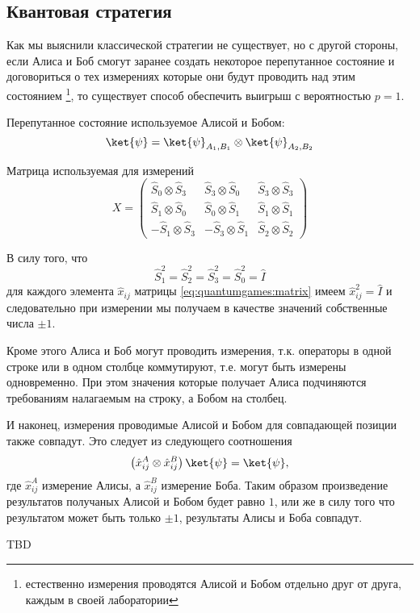 \subsection{Квантовая стратегия}
Как мы выяснили классической стратегии не существует, но с другой
стороны, если Алиса и Боб смогут заранее создать некоторое
перепутанное состояние и договориться о тех измерениях которые они
будут проводить над этим состоянием
\footnote{
естественно измерения проводятся Алисой и Бобом отдельно друг от
друга, каждым в своей лаборатории 
}, то существует способ обеспечить выигрыш с вероятностью $p = 1$.

Перепутанное состояние используемое Алисой и Бобом:
\begin{equation}
\ket{\psi} = \ket{\psi}_{A_1,B_1} \otimes \ket{\psi}_{A_2,B_2}
\nonumber
\end{equation}

Матрица используемая для измерений
\begin{equation}
X =
\left(
\begin{array}{ccc}
\hat{S}_0 \otimes \hat{S}_3 & \hat{S}_3 \otimes \hat{S}_0 & \hat{S}_3 \otimes \hat{S}_3 \\
\hat{S}_1 \otimes \hat{S}_0 & \hat{S}_0 \otimes \hat{S}_1 & \hat{S}_1 \otimes \hat{S}_1 \\
- \hat{S}_1 \otimes \hat{S}_3 & - \hat{S}_3 \otimes \hat{S}_1 & \hat{S}_2 \otimes \hat{S}_2  
\end{array}
\right)
\label{eq:quantumgames:matrix}
\end{equation}

В силу того, что 
\[
\hat{S}_1^2 = \hat{S}_2^2 = \hat{S}_3^2 = \hat{S}_0^2 = \hat{I}
\]
для каждого элемента $\hat{x}_{ij}$ матрицы
\eqref{eq:quantumgames:matrix} имеем $\hat{x}_{ij}^2 = \hat{I}$ и
следовательно при измерении мы получаем в качестве значений
собственные числа $\pm 1$.

Кроме этого Алиса и Боб могут проводить измерения, т.к. операторы в
одной строке или в одном столбце коммутируют, т.е. могут быть измерены
одновременно. При этом значения которые получает Алиса подчиняются
требованиям налагаемым на строку, а Бобом на столбец.

И наконец, измерения проводимые Алисой и Бобом для совпадающей позиции
также совпадут. Это следует из следующего соотношения
\[
\left(\hat{x}_{ij}^A \otimes \hat{x}_{ij}^B\right) \ket{\psi} = \ket{\psi},
\]
где $\hat{x}_{ij}^A$ измерение Алисы, а $\hat{x}_{ij}^B$ измерение
Боба. Таким образом произведение результатов получаных Алисой и Бобом
будет равно $1$, или же в силу того что результатом может быть только
$\pm 1$, результаты Алисы и Боба совпадут. 


TBD
